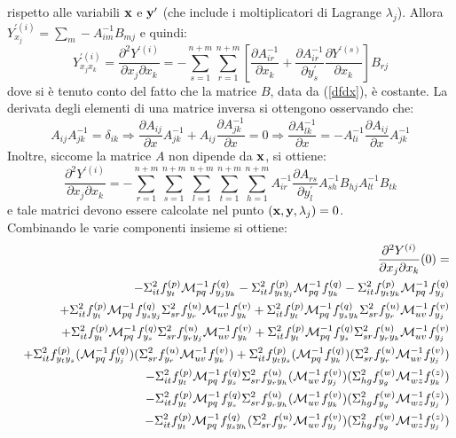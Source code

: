rispetto alle variabili ${\bf x}$ e ${\bf y}^\prime$ (che include i moltiplicatori
di Lagrange $\lambda_j$). Allora $Y^{\prime(i)}_{x_j}=\sum_m-A^{-1}_{im}B_{mj}$ e quindi:
\[Y^{\prime(i)}_{x_jx_k}=\frac{\partial^2 Y^{\prime(i)}}{\partial x_j\partial x_k}=-\sum_{s=1}^{n+m}\sum_{r=1}^{n+m}\left[\frac{\partial A^{-1}_{ir}}{\partial x_k}+\frac{\partial A^{-1}_{ir}}{\partial y^\prime_s}\frac{\partial Y^{\prime(s)}}{\partial x_k}\right]B_{rj}\]
dove si \`e tenuto conto del fatto che la matrice $B$, data da (\ref{dfdx}), \`e costante. La derivata
degli elementi di una matrice inversa si ottengono osservando che:
\begin{equation}
\label{derinv}
A_{ij}A^{-1}_{jk}=\delta_{ik}\Rightarrow\frac{\partial A_{ij}}{\partial x}A^{-1}_{jk}+A_{ij}\frac{\partial A^{-1}_{jk}}{\partial x}=0\Rightarrow\frac{\partial A^{-1}_{lk}}{\partial x}=-A^{-1}_{li}\frac{\partial A_{ij}}{\partial x}A^{-1}_{jk}\end{equation}Inoltre, siccome la matrice $A$ non dipende da ${\bf x}$, si ottiene:\begin{equation}\label{dersecmatr}\frac{\partial^2 Y^{\prime(i)}}{\partial x_j\partial x_k}=-\sum_{r=1}^{n+m}\sum_{s=1}^{n+m}\sum_{l=1}^{n+m}\sum_{t=1}^{n+m}\sum_{h=1}^{n+m}A^{-1}_{ir}\frac{\partial A_{rs}}{\partial y^\prime_l}A^{-1}_{sh}B_{hj}A^{-1}_{lt}B_{tk}\end{equation}e tale matrici devono essere calcolate nel punto $({\bf x},{\bf y},\lambda_j)=0$.\\Combinando le varie componenti insieme si ottiene:
\begin{eqnarray*}
&&\frac{\partial^2 Y^{(i)}}{\partial x_j\partial x_k}(0)=\\
&&-\Sigma^2_{it}f^{(p)}_{y_t}{\cal M}^{-1}_{pq}f^{(q)}_{y_jy_k}  -\Sigma^2_{it}f^{(p)}_{y_ty_j}{\cal M}^{-1}_{pq}f^{(q)}_{y_k}  -\Sigma^2_{it}f^{(p)}_{y_ty_k}{\cal M}^{-1}_{pq}f^{(q)}_{y_j}\\
&&+\Sigma^2_{it}f^{(p)}_{y_t}{\cal M}^{-1}_{pq}f^{(q)}_{y_sy_j}   \Sigma^2_{sr}f^{(u)}_{y_r}{\cal M}^{-1}_{uv}f^{(v)}_{y_k}  +\Sigma^2_{it}f^{(p)}_{y_t}{\cal M}^{-1}_{pq}f^{(q)}_{y_sy_k}   \Sigma^2_{sr}f^{(u)}_{y_r}{\cal M}^{-1}_{uv}f^{(v)}_{y_j}\\
&&+\Sigma^2_{it}f^{(p)}_{y_t}{\cal M}^{-1}_{pq}f^{(q)}_{y_s}   \Sigma^2_{sr}f^{(u)}_{y_ry_j}{\cal M}^{-1}_{uv}f^{(v)}_{y_k}  +\Sigma^2_{it}f^{(p)}_{y_t}{\cal M}^{-1}_{pq}f^{(q)}_{y_s}   \Sigma^2_{sr}f^{(u)}_{y_ry_k}{\cal M}^{-1}_{uv}f^{(v)}_{y_j}\\
&&+\Sigma^2_{it}f^{(p)}_{y_ty_s}({\cal M}^{-1}_{pq}f^{(q)}_{y_j})   (\Sigma^2_{sr}f^{(u)}_{y_r}{\cal M}^{-1}_{uv}f^{(v)}_{y_k})  +\Sigma^2_{it}f^{(p)}_{y_ty_s}({\cal M}^{-1}_{pq}f^{(q)}_{y_k})   (\Sigma^2_{sr}f^{(u)}_{y_r}{\cal M}^{-1}_{uv}f^{(v)}_{y_j})\\
&&-\Sigma^2_{it}f^{(p)}_{y_t}{\cal M}^{-1}_{pq}f^{(q)}_{y_s}   \Sigma^2_{sr}f^{(u)}_{y_ry_h}({\cal M}^{-1}_{uv}f^{(v)}_{y_j})  (\Sigma^2_{hg}f^{(w)}_{y_g}{\cal M}^{-1}_{wz}f^{(z)}_{y_k})\\
&&-\Sigma^2_{it}f^{(p)}_{y_t}{\cal M}^{-1}_{pq}f^{(q)}_{y_s}   \Sigma^2_{sr}f^{(u)}_{y_ry_h}({\cal M}^{-1}_{uv}f^{(v)}_{y_k})  (\Sigma^2_{hg}f^{(w)}_{y_g}{\cal M}^{-1}_{wz}f^{(z)}_{y_j})\\
&&-\Sigma^2_{it}f^{(p)}_{y_t}{\cal M}^{-1}_{pq}f^{(q)}_{y_sy_h}   (\Sigma^2_{sr}f^{(u)}_{y_r}{\cal M}^{-1}_{uv}f^{(v)}_{y_j})   (\Sigma^2_{hg}f^{(w)}_{y_g}{\cal M}^{-1}_{wz}f^{(z)}_{y_j})\end{eqnarray*}
